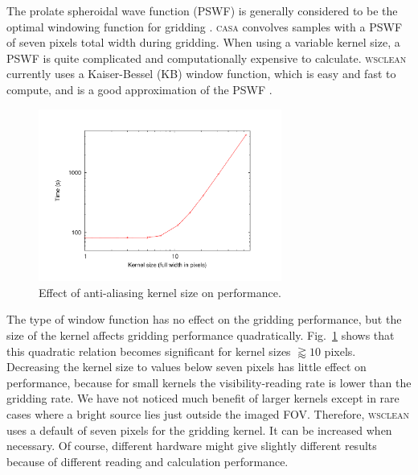 \documentclass[useAMS,usenatbib]{mn2e}
\begin{document}
The prolate spheroidal wave function (PSWF) is generally considered to be the optimal windowing function for gridding \citep{fourier-kernel-selection-1991}. \textsc{casa} convolves samples with a PSWF of seven pixels total width during gridding. When using a variable kernel size, a PSWF is quite complicated and computationally expensive to calculate. \textsc{wsclean} currently uses a Kaiser-Bessel (KB) window function, which is easy and fast to compute, and is a good approximation of the PSWF \citep{fourier-kernel-selection-1991}.

\begin{figure}
\begin{center}
\includegraphics[width=8cm]{img/benchmark-kernelsize/kernel}
\caption{Effect of anti-aliasing kernel size on performance.}
\label{fig:timing-kernelsize}
\end{center}
\end{figure}

The type of window function has no effect on the gridding performance, but the size of the kernel affects gridding performance quadratically. Fig.~\ref{fig:timing-kernelsize} shows that this quadratic relation becomes significant for kernel sizes $\gtrapprox 10$ pixels. Decreasing the kernel size to values below seven pixels has little effect on performance, because for small kernels the visibility-reading rate is lower than the gridding rate. We have not noticed much benefit of larger kernels except in rare cases where a bright source lies just outside the imaged FOV. Therefore, \textsc{wsclean} uses a default of seven pixels for the gridding kernel. It can be increased when necessary. Of course, different hardware might give slightly different results because of different reading and calculation performance.
\end{document}
